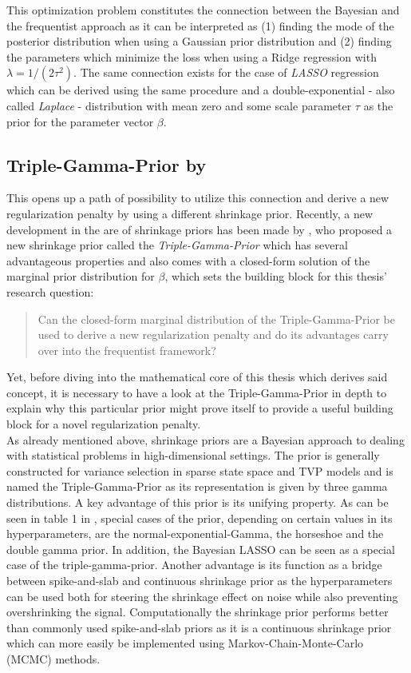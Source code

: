 \documentclass[12pt,a4paper]{article}
\begin{document}
This optimization problem constitutes the connection between the Bayesian and the frequentist approach as it can be interpreted as (1) finding the mode of the posterior distribution when using a Gaussian prior distribution and (2) finding the parameters which minimize the loss when using a Ridge regression with $\lambda = 1/(2\tau^2)$. The same connection exists for the case of \textit{LASSO} regression which can be derived using the same procedure and a double-exponential - also called \textit{Laplace} - distribution with mean zero and some scale parameter $\tau$ as the prior for the parameter vector $\beta$. 

\subsection{Triple-Gamma-Prior by \textcite{TGP2020}}
This opens up a path of possibility to utilize this connection and derive a new regularization penalty by using a different shrinkage prior. Recently, a new development in the are of shrinkage priors has been made by \textcite{TGP2020}, who proposed a new shrinkage prior called the \textit{Triple-Gamma-Prior} which has several advantageous properties and also comes with a closed-form solution of the marginal prior distribution for $\beta$, which sets the building block for this thesis' research question:

\begin{quote}
Can the closed-form marginal distribution of the Triple-Gamma-Prior
be used to derive a new regularization penalty and do its advantages
carry over into the frequentist framework?
\end{quote}

Yet, before diving into the mathematical core of this thesis which derives said concept, it is necessary to have a look at the Triple-Gamma-Prior in depth to explain why this particular prior might prove itself to provide a useful building block for a novel regularization penalty.\\

As already mentioned above, shrinkage priors are a Bayesian approach to dealing with statistical problems in high-dimensional settings. The prior is generally constructed for variance selection in sparse state space and TVP models and is named the Triple-Gamma-Prior as its representation is given by three gamma distributions. A key advantage of this prior is its unifying property. As can be seen in table 1 in \textcite{TGP2020}, special cases of the prior, depending on certain values in its hyperparameters, are the normal-exponential-Gamma, the horseshoe and the double gamma prior. In addition, the Bayesian LASSO can be seen as a special case of the triple-gamma-prior. Another advantage is its function as a bridge between spike-and-slab and continuous shrinkage prior as the hyperparameters can be used both for steering the shrinkage effect on noise while also preventing overshrinking the signal. Computationally the shrinkage prior performs better than commonly used spike-and-slab priors as it is a continuous shrinkage prior which can more easily be implemented using Markov-Chain-Monte-Carlo (MCMC) methods.\\ 
\end{document}

